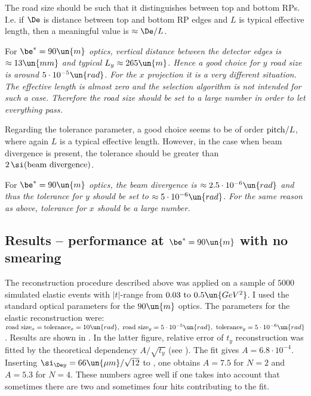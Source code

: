 The road size should be such that it distinguishes between top and bottom RPs. I.e. if $\De$ is distance between top and bottom RP edges and $L$ is typical effective length, then a meaningful value is $\approx \De / L$.

For \em{$\be^* = 90\un{m}$ optics}, vertical distance between the detector edges is $\approx 13\un{mm}$ and typical $L_y \approx 265\un{m}$. Hence a good choice for $y$ road size is around $5\cdot10^{-5}\un{rad}$. For the $x$ projection it is a very different situation. The effective length is almost zero and the selection algorithm is not intended for such a case. Therefore the road size should be set to a large number in order to let everything pass.

Regarding the tolerance parameter, a good choice seems to be of order ${\rm pitch}/L$, where again $L$ is a typical effective length. However, in the case when beam divergence is present, the tolerance should be greater than $2\,\si({\rm beam\ divergence})$.

For \em{$\be^* = 90\un{m}$ optics}, the beam divergence is $\approx 2.5\cdot10^{-6}\un{rad}$ and thus the tolerance for $y$ should be set to $\approx 5\cdot10^{-6}\un{rad}$. For the same reason as above, tolerance for $x$ should be a large number.



\subsection{Results -- performance at $\be^* = 90\un{m}$ with no smearing}


The reconstruction procedure described above was applied on a sample of $5000$ simulated elastic events with $|t|$-range from $0.03\hbox{ to }0.5\un{GeV^2}$. I used the standard optical parameters for the $90\un{m}$ optics. The parameters for the elastic reconstruction were: ${\rm road\ size}_x = {\rm tolerance}_x = 10\un{rad},\ {\rm road\ size}_y = 5\cdot10^{-5}\un{rad},\ {\rm tolerance}_y = 5\cdot10^{-6}\un{rad}$. Results are shown in . In the latter figure, relative error of $t_y$ reconstruction was fitted by the theoretical dependency $A/\sqrt{t_y}$ (see ). The fit gives $A = 6.8\cdot10^{-4}$. Inserting $\si_{\De y} = 66\un{\mu m}/ \sqrt{12}$ to , one obtains $A = 7.5$ for $N = 2$ and $A = 5.3$ for $N = 4$. These numbers agree well if one takes into account that sometimes there are two and sometimes four hits contributing to the fit.

